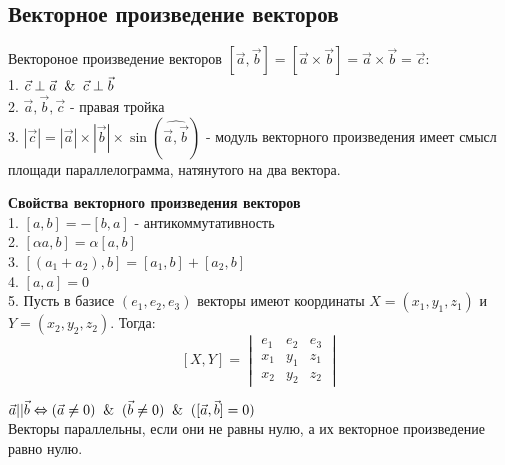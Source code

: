 \subsection{Векторное произведение векторов}
\begin{defin}
Вектороное произведение векторов $[\Vec{a},\Vec{b}]=[\Vec{a}\times \Vec{b}]=
\Vec{a}\times \Vec{b}=\Vec{c}:$\\
1. $\Vec{c}\perp\Vec{a} \And \Vec{c}\perp\Vec{b}$\\
2. $\Vec{a},\Vec{b},\Vec{c}$ - правая тройка\\
3. $|\Vec{c}|=|\Vec{a}|\times|\Vec{b}|\times\sin{(\widehat{\Vec{a},\Vec{b}})}$
- модуль векторного произведения имеет смысл площади параллелограмма,
натянутого на два вектора. 
\end{defin}
\textbf{Свойства векторного произведения векторов}\\
1. $[a,b]=-[b,a]$ - антикоммутативность\\
2. $[\alpha a,b]=\alpha[a,b]$\\
3. $[(a_1+a_2),b]=[a_1,b]+[a_2,b]$\\
4. $[a,a]=0$\\
5. Пусть в базисе $(e_1,e_2,e_3)$ векторы имеют координаты
$X=(x_1,y_1,z_1)$ и $Y=(x_2,y_2,z_2)$. Тогда:
$$[X,Y]= \begin{vmatrix}e_1&e_2&e_3\\x_1&y_1&z_1\\
x_2&y_2&z_2
\end{vmatrix}
$$

\begin{defin}
$\Vec{a}||\Vec{b}\Leftrightarrow(\Vec{a}\ne0)\And(\Vec{b}\ne0)\And([\Vec{a},\Vec{b}]=0)$\\
Векторы параллельны, если они не равны нулю, а их векторное произведение равно нулю.
\end{defin}
